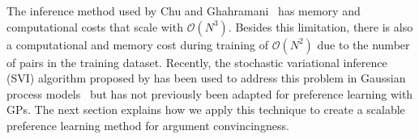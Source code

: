 The inference method used by Chu and Ghahramani~%
has memory and computational costs that scale with $\mathcal{O}(N^3)$. %
Besides this limitation, there is also a computational and memory cost 
during training of $\mathcal{O}(N^2)$ due to the number of pairs in the training dataset.
Recently, the stochastic variational inference (SVI) algorithm proposed by \cite{hoffman2013stochastic} 
has been used to address this problem in Gaussian process models~\cite{hensman2013gaussian,hensman_scalable_2015} 
but has not previously been adapted for preference learning with GPs.
The next section explains how we apply this technique to create a scalable preference learning method for argument convincingness.

